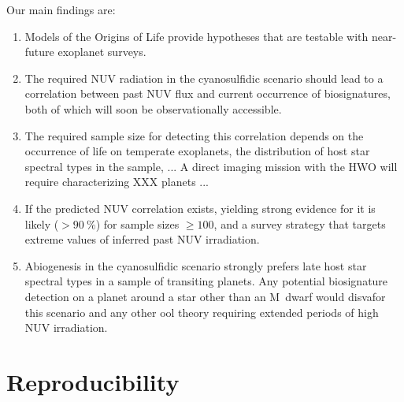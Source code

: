 \documentclass[modern,linenumbers]{aastex631}
\begin{document}
Our main findings are:
\begin{enumerate}
    \item Models of the Origins of Life provide hypotheses that are testable with near-future exoplanet surveys.
    \item The required \gls{NUV} radiation in the cyanosulfidic scenario should lead to a correlation between past \gls{NUV} flux and current occurrence of biosignatures, both of which will soon be observationally accessible.
    \item The required sample size for detecting this correlation depends on the occurrence of life on temperate exoplanets, the distribution of host star spectral types in the sample, ...
        A direct imaging mission with the \gls{HWO} will require characterizing XXX planets ...
    \item If the predicted \gls{NUV} correlation exists, yielding strong evidence for it is likely ($> \SI{90}{\percent}$) for sample sizes $\geq 100$, and a survey strategy that targets extreme values of inferred past \gls{NUV} irradiation.
    \item Abiogenesis in the cyanosulfidic scenario strongly prefers late host star spectral types in a sample of transiting planets. Any potential biosignature detection on a planet around a star other than an M~dwarf would disvafor this scenario and any other \gls{ool} theory requiring extended periods of high \gls{NUV} irradiation.
\end{enumerate}

%

\section*{Reproducibility}


\end{document}
